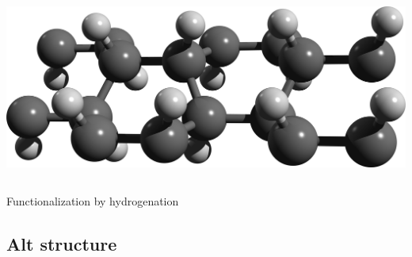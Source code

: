 \documentclass{beamer}
\begin{document}
\begin{frame}
\begin{columns}
\begin{center}
\vspace{7mm}
\includegraphics[width=1.0\textwidth]{figs/boat1.png}\\

\vspace{3mm}
\end{center}

\end{columns}

\begin{center}

{\huge Functionalization by hydrogenation}
\end{center}
\end{frame}




\subsection{Alt structure}
\end{document}
